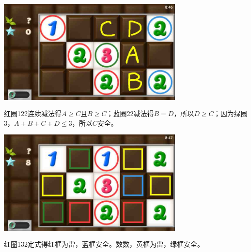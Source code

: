 \subsection{} %
\begin{center}
    \includegraphics[width=0.7\textwidth]{puzzlelow/111-1.jpg}
\end{center}
红圈122连续减法得$A\ge C$且$B\ge C$；蓝圈22减法得$B=D$，所以$D\ge C$；因为绿圈3，$A+B+C+D\le 3$，所以$C$安全。
\begin{center}
    \includegraphics[width=0.7\textwidth]{puzzlelow/111-2.jpg}
\end{center}
红圈132定式得红框为雷，蓝框安全。数数，黄框为雷，绿框安全。


